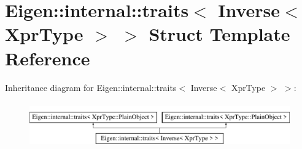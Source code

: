\hypertarget{struct_eigen_1_1internal_1_1traits_3_01_inverse_3_01_xpr_type_01_4_01_4}{}\section{Eigen\+:\+:internal\+:\+:traits$<$ Inverse$<$ Xpr\+Type $>$ $>$ Struct Template Reference}
\label{struct_eigen_1_1internal_1_1traits_3_01_inverse_3_01_xpr_type_01_4_01_4}
Inheritance diagram for Eigen\+:\+:internal\+:\+:traits$<$ Inverse$<$ Xpr\+Type $>$ $>$\+:\begin{figure}[H]
\begin{center}
\leavevmode
\includegraphics[height=2.000000cm]{struct_eigen_1_1internal_1_1traits_3_01_inverse_3_01_xpr_type_01_4_01_4}
\end{center}
\end{figure}
